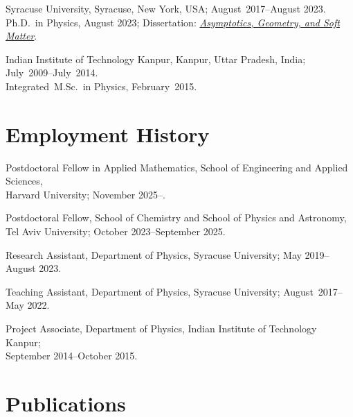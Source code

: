 \documentclass[10pt,article,oneside]{memoir}
\begin{document}
Syracuse University, Syracuse, New York, USA; August~2017--August 2023.\\
Ph.D.~in Physics, August 2023; Dissertation: \emph{\href{https://raw.githubusercontent.com/manu-mannattil/thesis/build/thesis.pdf}{Asymptotics, Geometry, and Soft Matter}}.

Indian Institute of Technology Kanpur, Kanpur, Uttar Pradesh, India; July~2009--July~2014.\\
Integrated~M.Sc.~in Physics, February~2015.




\section{Employment History}

Postdoctoral Fellow in Applied Mathematics, School of Engineering and Applied Sciences,\\
Harvard University; November 2025--.

Postdoctoral Fellow, School of Chemistry and School of Physics and Astronomy,\\
Tel Aviv University; October 2023--September 2025.

Research Assistant, Department of Physics, Syracuse University; May 2019--August 2023.

Teaching Assistant, Department of Physics, Syracuse University; August~2017--May 2022.

Project Associate, Department of Physics, Indian Institute of Technology Kanpur;\\ September 2014--October 2015.


\section{Publications}

\end{document}
